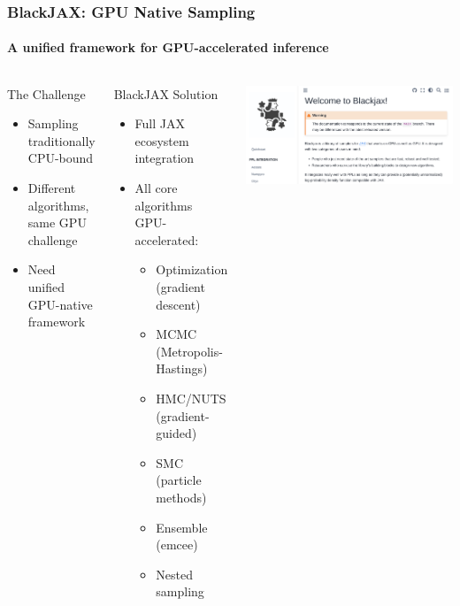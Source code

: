 \documentclass[aspectratio=169]{beamer}
\begin{document}
\begin{frame}
    \frametitle{BlackJAX: GPU Native Sampling}
    \framesubtitle{A unified framework for GPU-accelerated inference}
    \begin{columns}
        \begin{block}{The Challenge}
            \begin{itemize}
                \item Sampling traditionally CPU-bound
                \item Different algorithms, same GPU challenge
                \item Need unified GPU-native framework
            \end{itemize}
        \end{block}
        \begin{block}{BlackJAX Solution}
            \begin{itemize}
                \item Full JAX ecosystem integration
                \item All core algorithms GPU-accelerated:
                    \begin{itemize}
                        \item Optimization (gradient descent)
                        \item MCMC (Metropolis-Hastings)
                        \item HMC/NUTS (gradient-guided)
                        \item SMC (particle methods)
                        \item Ensemble (emcee) 
                        \item Nested sampling 
                    \end{itemize}
            \end{itemize}
        \end{block}
        \vspace{10pt}
        \begin{center}
            \includegraphics[width=\textwidth]{figures/blackjax_screenshot.png}

\end{center}
\end{columns}
\end{frame}
\end{document}
